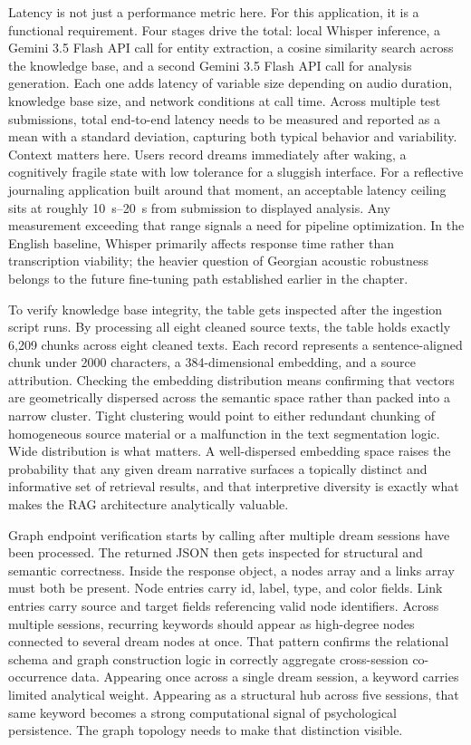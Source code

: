 \documentclass[12pt,a4paper]{report}
\DeclareRobustCommand{\code}[1]{\texttt{\detokenize{#1}}}
\begin{document}
Latency is not just a performance metric here. For this application, it is a functional requirement. Four stages drive the total: local Whisper inference, a Gemini 3.5 Flash API call for entity extraction, a \code{pgvector} cosine similarity search across the knowledge base, and a second Gemini 3.5 Flash API call for analysis generation. Each one adds latency of variable size depending on audio duration, knowledge base size, and network conditions at call time. Across multiple test submissions, total end-to-end latency needs to be measured and reported as a mean with a standard deviation, capturing both typical behavior and variability. Context matters here. Users record dreams immediately after waking, a cognitively fragile state with low tolerance for a sluggish interface. For a reflective journaling application built around that moment, an acceptable latency ceiling sits at roughly \SIrange{10}{20}{\second} from submission to displayed analysis. Any measurement exceeding that range signals a need for pipeline optimization. In the English baseline, Whisper primarily affects response time rather than transcription viability; the heavier question of Georgian acoustic robustness belongs to the future fine-tuning path established earlier in the chapter.

To verify knowledge base integrity, the \code{knowledge_base} table gets inspected after the ingestion script runs. By processing all eight cleaned source texts, the table holds exactly 6,209 chunks across eight cleaned texts. Each record represents a sentence-aligned chunk under \num{2000} characters, a \num{384}-dimensional embedding, and a source attribution. Checking the embedding distribution means confirming that vectors are geometrically dispersed across the semantic space rather than packed into a narrow cluster. Tight clustering would point to either redundant chunking of homogeneous source material or a malfunction in the text segmentation logic. Wide distribution is what matters. A well-dispersed embedding space raises the probability that any given dream narrative surfaces a topically distinct and informative set of retrieval results, and that interpretive diversity is exactly what makes the RAG architecture analytically valuable.

Graph endpoint verification starts by calling \code{GET /v1/graph/data} after multiple dream sessions have been processed. The returned JSON then gets inspected for structural and semantic correctness. Inside the response object, a nodes array and a links array must both be present. Node entries carry id, label, type, and color fields. Link entries carry source and target fields referencing valid node identifiers. Across multiple sessions, recurring keywords should appear as high-degree nodes connected to several dream nodes at once. That pattern confirms the relational schema and graph construction logic in \code{app/services/graph_logic.py} correctly aggregate cross-session co-occurrence data. Appearing once across a single dream session, a keyword carries limited analytical weight. Appearing as a structural hub across five sessions, that same keyword becomes a strong computational signal of psychological persistence. The graph topology needs to make that distinction visible.
\end{document}
